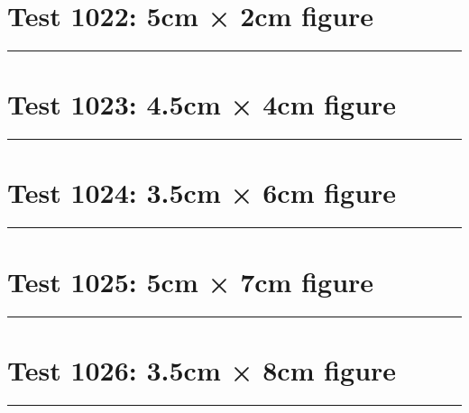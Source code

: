 \documentclass[a4paper,11pt]{article}
\begin{document}
\section*{Test 1022: 5cm × 2cm figure}
\begin{swarmwrap}%
  \begin{minipage}[t]{5cm}
    \centering
    \rule{\linewidth}{2cm}
  \end{minipage}%
\end{swarmwrap}%
\swarmwrapnext
\lipsum[37]
\lipsum[38]
\lipsum[39]
\section*{Test 1023: 4.5cm × 4cm figure}
\begin{swarmwrap}%
  \begin{minipage}[t]{4cm}
    \centering
    \rule{\linewidth}{4cm}
  \end{minipage}%
\end{swarmwrap}%
\swarmwrapnext
\lipsum[93]
\lipsum[94]
\lipsum[95]
\lipsum[96]
\lipsum[97]
\section*{Test 1024: 3.5cm × 6cm figure}
\begin{swarmwrap}%
  \begin{minipage}[t]{3cm}
    \centering
    \rule{\linewidth}{6cm}
  \end{minipage}%
\end{swarmwrap}%
\swarmwrapnext
\lipsum[97]
\lipsum[98]
\lipsum[99]
\section*{Test 1025: 5cm × 7cm figure}
\begin{swarmwrap}%
  \begin{minipage}[t]{5cm}
    \centering
    \rule{\linewidth}{7cm}
  \end{minipage}%
\end{swarmwrap}%
\swarmwrapnext
\lipsum[31]
\lipsum[32]
\lipsum[33]
\lipsum[34]
\section*{Test 1026: 3.5cm × 8cm figure}
\begin{swarmwrap}%
  \begin{minipage}[t]{3cm}
    \centering
    \rule{\linewidth}{8cm}
  \end{minipage}%
\end{swarmwrap}%
\swarmwrapnext
\lipsum[71]
\lipsum[72]
\lipsum[73]
\lipsum[74]
\lipsum[75]
\lipsum[76]
\end{document}
